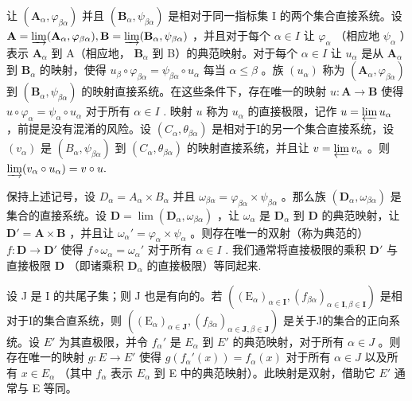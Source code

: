让 \((\mathbf{A}_{\alpha}, \varphi_{\beta \alpha})\) 并且 \((\mathbf{B}_{\alpha}, \psi_{\beta \alpha})\) 是相对于同一指标集 I 的两个集合直接系统。设 \(\mathbf{A} = \varinjlim (\mathbf{A}_{\alpha}, \varphi_{\beta \alpha}), \mathbf{B} = \varinjlim (\mathbf{B}_{\alpha}, \psi_{\beta \alpha})\) ，并且对于每个 \(\alpha \in I\) 让 \(\varphi_{\alpha}\) （相应地 \(\psi_{\alpha}\) ）表示 \(\mathbf{A}_{\alpha}\) 到 A（相应地， \(\mathbf{B}_{\alpha}\) 到 B）的典范映射。对于每个 \(\alpha \in I\) 让 \(u_{\alpha}\) 是从 \(\mathbf{A}_{\alpha}\) 到 \(\mathbf{B}_{\alpha}\) 的映射，使得 \(u_{\beta} \circ \varphi_{\beta \alpha} = \psi_{\beta \alpha} \circ u_{\alpha}\) 每当 \(\alpha \leqslant \beta\) 。族 \((u_{\alpha})\) 称为 \((\mathbf{A}_{\alpha}, \varphi_{\beta \alpha})\) 到 \((\mathbf{B}_{\alpha}, \psi_{\beta \alpha})\) 的映射直接系统。在这些条件下，存在唯一的映射 \(u: \mathbf{A} \to \mathbf{B}\) 使得 \(u \circ \varphi_{\alpha} = \psi_{\alpha} \circ u_{\alpha}\) 对于所有 \(\alpha \in I\) . 映射 \(u\) 称为 \(u_{\alpha}\) 的直接极限，记作 \(u = \varprojlim u_{\alpha}\) ，前提是没有混淆的风险。设 \((C_{\alpha}, \theta_{\beta \alpha})\) 是相对于I的另一个集合直接系统，设 \((v_{\alpha})\) 是 \((B_{\alpha}, \psi_{\beta \alpha})\) 到 \((C_{\alpha}, \theta_{\beta \alpha})\) 的映射直接系统，并且让 \(v = \varprojlim v_{\alpha}\) 。则 \(\varinjlim (v_{\alpha} \circ u_{\alpha}) = v \circ u.\)

保持上述记号，设 \(D_{\alpha}=A_{\alpha}\times B_{\alpha}\) 并且 \(\omega_{\beta\alpha}=\varphi_{\beta\alpha}\times\psi_{\beta\alpha}\) 。那么族 \((\mathbf{D}_{\alpha},\omega_{\beta\alpha})\) 是集合的直接系统。设 \(\mathbf{D}=\lim(\mathbf{D}_{\alpha},\omega_{\beta\alpha})\) ，让 \(\omega_{\alpha}\) 是 \(\mathbf{D}_{\alpha}\) 到 \(\mathbf{D}\) 的典范映射，让 \(\mathbf{D}' = \mathbf{A} \times \mathbf{B}\) ，并且让 \(\omega_{\alpha}' = \varphi_{\alpha} \times \psi_{\alpha}\) 。则存在唯一的双射（称为典范的） \(f: \mathbf{D} \to \mathbf{D}'\) 使得 \(f \circ \omega_{\alpha} = \omega_{\alpha}'\) 对于所有 \(\alpha \in I\) . 我们通常将直接极限的乘积 \(\mathbf{D}'\) 与直接极限 \(\mathbf{D}\) （即诸乘积 \(\mathbf{D}_{\alpha}\) 的直接极限）等同起来.

设 J 是 I 的共尾子集；则 J 也是有向的。若 \(((\mathrm{E}_{\alpha})_{\alpha\in\mathbf{I}}, (f_{\beta\alpha})_{\alpha\in\mathbf{I},\beta\in\mathbf{I}})\) 是相对于I的集合直系统，则 \(((\mathrm{E}_{\alpha})_{\alpha\in\mathbf{J}}, (f_{\beta\alpha})_{\alpha\in\mathbf{J},\beta\in\mathbf{J}})\) 是关于J的集合的正向系统。设 \(E'\) 为其直极限，并令 \(f_{\alpha}'\) 是 \(E_{\alpha}\) 到 \(E'\) 的典范映射，对于所有 \(\alpha\in J\) 。则存在唯一的映射 \(g:E\to E'\) 使得 \(g(f_{\alpha}'(x))=f_{\alpha}(x)\) 对于所有 \(\alpha\in J\) 以及所有 \(x\in E_{\alpha}\) （其中 \(f_{\alpha}\) 表示 \(E_{\alpha}\) 到 E 中的典范映射）。此映射是双射，借助它 \(E'\) 通常与 E 等同。

